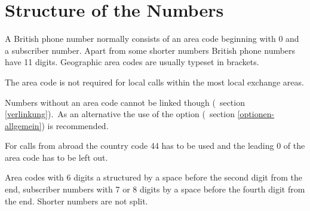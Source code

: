 \documentclass[numbers=noenddot]{scrreprt}
\newcommand{\UeberschriftAufbau}{\section{Structure of the Numbers}}
\newcommand{\KeineVerlinkung}{Numbers without an area code cannot be linked though
\vglAbschnitt{verlinkung}.}
\newcommand*{\vglAbschnitt}[1]{(\cf\ section \ref{#1})}
\newcommand*{\AufbauDEATD}[1]{For calls from abroad the country code #1 has to be used and the leading 0 of the area code has to be left out.}
\begin{document}
\UeberschriftAufbau
A British phone number normally consists of an area code beginning with 0 and a subscriber number. Apart from some shorter numbers British phone numbers have 11 digits. Geographic area codes are usually typeset in brackets.
\begin{sidebyside}
\end{sidebyside}

The area code is not required for local calls within the most local exchange areas.
\begin{sidebyside}
\end{sidebyside}
\KeineVerlinkung\ As an alternative the use of the  option
\vglAbschnitt{optionen-allgemein} is recommended.

\AufbauDEATD{44}
\begin{sidebyside}
\end{sidebyside}

Area codes with 6 digits a structured by a space before the second digit from the end, subscriber numbers with 7 or 8 digits by a space before the fourth digit from the end. Shorter numbers are not split.
\begin{sidebyside}
   \\
   \\
\end{sidebyside}
\end{document}
